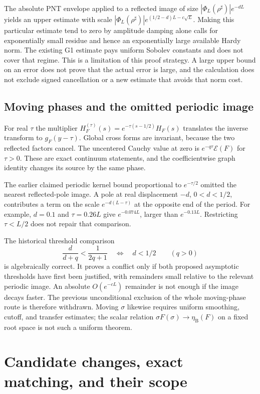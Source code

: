 \documentclass[11pt]{article}
\theoremstyle{remark}
\begin{document}
The absolute PNT envelope applied to a reflected image of size
$|\Phi_L(\rho^\sharp)|e^{-dL}$ yields an upper estimate with scale
$|\Phi_L(\rho^\sharp)|e^{(1/2-d)L-c\sqrt L}$.
Making this particular estimate tend to zero by amplitude damping
alone calls for exponentially small residue and hence an exponentially
large available Hardy norm. The existing G1 estimate pays uniform
Sobolev constants and does not cover that regime. This is a limitation
of this proof strategy. A large upper bound on an error does not prove
that the actual error is large, and the calculation does not exclude
signed cancellation or a new estimate that avoids that norm cost.

\subsection*{Moving phases and the omitted periodic image}
For real $\tau$ the multiplier
$H_F^{(\tau)}(s)=e^{-\tau(s-1/2)}H_F(s)$ translates the inverse
transform to $g_F(y-\tau)$. Global cross forms are invariant, because
the two reflected factors cancel. The uncentered Cauchy value at zero
is $e^{-q\tau}\mathscr E(F)$ for $\tau>0$.
These are exact continuum statements, and the coefficientwise graph
identity changes its source by the same phase.

The earlier claimed periodic kernel bound proportional to $e^{-\tau/2}$
omitted the nearest reflected-pole image. A pole at real displacement
$-d$, $0<d<1/2$, contributes a term on the scale
$e^{-d(L-\tau)}$ at the opposite end of the period. For example,
$d=0.1$ and $\tau=0.26L$ give $e^{-0.074L}$, larger than
$e^{-0.13L}$. Restricting $\tau<L/2$ does not repair that comparison.

The historical threshold comparison
\[
 \frac{d}{d+q}<\frac1{2q+1}\quad\Longleftrightarrow\quad d<1/2
 \qquad(q>0)
\]
is algebraically correct. It proves a conflict only if both proposed
asymptotic thresholds have first been justified, with remainders small
relative to the relevant periodic image. An absolute $O(e^{-cL})$
remainder is not enough if the image decays faster. The previous
unconditional exclusion of the whole moving-phase route is therefore
withdrawn. Moving $\sigma$ likewise requires uniform smoothing, cutoff,
and transfer estimates; the scalar relation
$\sigma F(\sigma)\to\eta_{\mathrm B}(F)$ on a fixed root space is
not such a uniform theorem.

\section{Candidate changes, exact matching, and their scope}\label{sec:matching}
\end{document}
